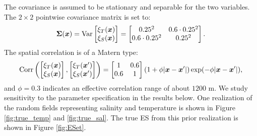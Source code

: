 \documentclass[aoas]{imsart}
\begin{document}
The covariance is assumed to be stationary and separable for the two variables. 
The $2 \times 2$ pointwise covariance matrix is set to:
\begin{equation}\label{v0}
\bSigma(\bx)=\mbox{Var} 
\begin{bmatrix}
    \xi_T(\bx) \\
    \xi_S(\bx) 
    \end{bmatrix}=
\begin{bmatrix}
0.25^2 & 0.6 \cdot 0.25^2 \\
0.6 \cdot 0.25^2 & 0.25^2
\end{bmatrix}.
\end{equation}
The spatial correlation is of a Matern type:
\begin{equation}\label{v}
\mbox{Corr} 
\left(
\begin{bmatrix}
    \xi_T(\bx) \\
    \xi_S(\bx) 
    \end{bmatrix},
    \begin{bmatrix}
    \xi_T(\bx') \\
    \xi_S(\bx') 
    \end{bmatrix}
    \right)
    = \begin{bmatrix}
1 & 0.6  \\
0.6  & 1
\end{bmatrix}(1+\phi |\bx-\bx'|)\exp (-\phi |\bx-\bx'|),
\end{equation}
and $\phi=0.3$ indicates an effective correlation range of about $1200$ m. 
We study sensitivity to the parameter specification in the results
below.  One realization of the random fields representing salinity and
temperature is shown in Figure \ref{fig:true_temp} and
\ref{fig:true_sal}. The true ES from this prior realization is shown
in Figure \ref{fig:ESet}.
\end{document}
